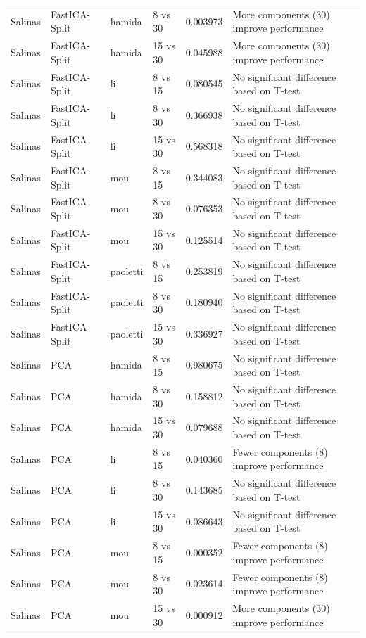 \begin{longtable}{llllrl}
Salinas & FastICA-Split & hamida & 8 vs 30 & 0.003973 & More components (30) improve performance \\
Salinas & FastICA-Split & hamida & 15 vs 30 & 0.045988 & More components (30) improve performance \\
Salinas & FastICA-Split & li & 8 vs 15 & 0.080545 & No significant difference based on T-test \\
Salinas & FastICA-Split & li & 8 vs 30 & 0.366938 & No significant difference based on T-test \\
Salinas & FastICA-Split & li & 15 vs 30 & 0.568318 & No significant difference based on T-test \\
Salinas & FastICA-Split & mou & 8 vs 15 & 0.344083 & No significant difference based on T-test \\
Salinas & FastICA-Split & mou & 8 vs 30 & 0.076353 & No significant difference based on T-test \\
Salinas & FastICA-Split & mou & 15 vs 30 & 0.125514 & No significant difference based on T-test \\
Salinas & FastICA-Split & paoletti & 8 vs 15 & 0.253819 & No significant difference based on T-test \\
Salinas & FastICA-Split & paoletti & 8 vs 30 & 0.180940 & No significant difference based on T-test \\
Salinas & FastICA-Split & paoletti & 15 vs 30 & 0.336927 & No significant difference based on T-test \\
Salinas & PCA & hamida & 8 vs 15 & 0.980675 & No significant difference based on T-test \\
Salinas & PCA & hamida & 8 vs 30 & 0.158812 & No significant difference based on T-test \\
Salinas & PCA & hamida & 15 vs 30 & 0.079688 & No significant difference based on T-test \\
Salinas & PCA & li & 8 vs 15 & 0.040360 & Fewer components (8) improve performance \\
Salinas & PCA & li & 8 vs 30 & 0.143685 & No significant difference based on T-test \\
Salinas & PCA & li & 15 vs 30 & 0.086643 & No significant difference based on T-test \\
Salinas & PCA & mou & 8 vs 15 & 0.000352 & Fewer components (8) improve performance \\
Salinas & PCA & mou & 8 vs 30 & 0.023614 & Fewer components (8) improve performance \\
Salinas & PCA & mou & 15 vs 30 & 0.000912 & More components (30) improve performance \\

\end{longtable}
